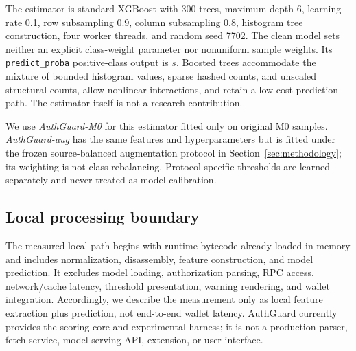 The estimator is standard XGBoost with 300 trees, maximum depth 6, learning rate 0.1, row subsampling 0.9, column subsampling 0.8, histogram tree construction, four worker threads, and random seed 7702. The clean model sets neither an explicit class-weight parameter nor nonuniform sample weights. Its \texttt{predict\_proba} positive-class output is $s$. Boosted trees accommodate the mixture of bounded histogram values, sparse hashed counts, and unscaled structural counts, allow nonlinear interactions, and retain a low-cost prediction path. The estimator itself is not a research contribution.

We use \emph{AuthGuard-M0} for this estimator fitted only on original M0 samples. \emph{AuthGuard-aug} has the same features and hyperparameters but is fitted under the frozen source-balanced augmentation protocol in Section~\ref{sec:methodology}; its weighting is not class rebalancing. Protocol-specific thresholds are learned separately and never treated as model calibration.

\subsection{Local processing boundary}

The measured local path begins with runtime bytecode already loaded in memory and includes normalization, disassembly, feature construction, and model prediction. It excludes model loading, authorization parsing, RPC access, network/cache latency, threshold presentation, warning rendering, and wallet integration. Accordingly, we describe the measurement only as local feature extraction plus prediction, not end-to-end wallet latency. AuthGuard currently provides the scoring core and experimental harness; it is not a production parser, fetch service, model-serving API, extension, or user interface.
